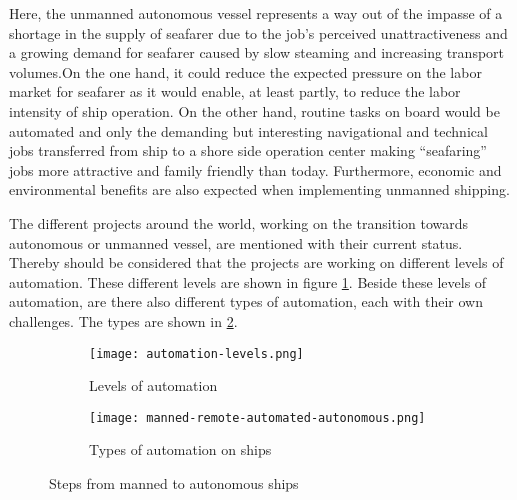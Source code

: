 Here, the unmanned autonomous vessel represents a way out of the impasse of a shortage in the supply of seafarer due to the job’s perceived unattractiveness and a growing demand for seafarer caused by slow steaming and increasing transport volumes.On the one hand, it could reduce the expected pressure on the labor market for seafarer as it would enable, at least partly, to reduce the labor intensity of ship operation. On the other hand, routine tasks on board would be automated and only the demanding but interesting navigational and technical jobs transferred from ship to a shore side operation center making “seafaring” jobs more attractive and family friendly than today. Furthermore, economic and environmental benefits are also expected when implementing unmanned shipping. \cite{MUNIN2016}

The different projects around the world, working on the transition towards autonomous or unmanned vessel, are mentioned with their current status. Thereby should be considered that the projects are working on different levels of automation. These different levels are shown in figure \ref{fig:automation-levels}.
Beside these levels of automation, are there also different types of automation, each with their own challenges. The types are shown in \ref{fig:manned-remote-autonomous}.

\begin{figure}[hb]
	\begin{subfigure}[b]{0.55\linewidth}
		\centering
		\texttt{[image: automation-levels.png]}
		\caption{Levels of automation}
		\label{fig:automation-levels}
	\end{subfigure} 
	\begin{subfigure}[b]{0.4\linewidth}
		\centering
		\texttt{[image: manned-remote-automated-autonomous.png]}
		\caption{Types of automation on ships}
		\label{fig:manned-remote-autonomous}
	\end{subfigure}
	\caption{Steps from manned to autonomous ships}
	\label{fig:automation} 
\end{figure}


